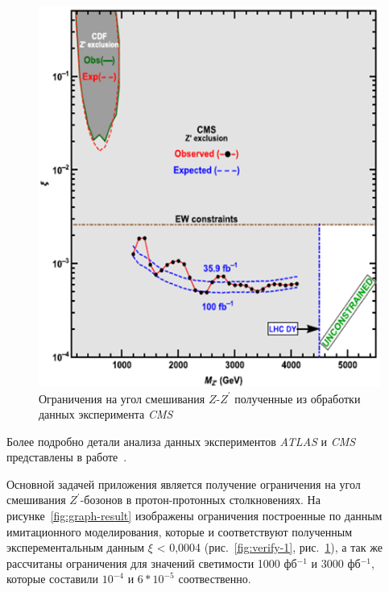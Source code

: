 \begin{figure}[!h]
	\centering
	\includegraphics[width=\textwidth]{figures/verify-2.png}
	\caption{Ограничения на угол смешивания $Z$-${Z}^{\prime}$ полученные из обработки данных эксперимента \textit{CMS}~\cite{2part-pankov}}
	\label{fig:verify-2}
\end{figure}

Более подробно детали анализа данных экспериментов \textit{ATLAS} и \textit{CMS} представлены в работе~\cite{2part-pankov}. 

Основной задачей приложения является получение ограничения на угол смешивания ${Z}^{\prime}$-бозонов в протон-протонных столкновениях. На рисунке~\ref{fig:graph-result} изображены ограничения построенные по данным имитационного моделирования, которые и соответствуют полученным эксперементальным данным $\xi$ < 0,0004 (рис.~\ref{fig:verify-1}, рис.~\ref{fig:verify-2}), а так же рассчитаны ограничения для значений светимости 1000 фб${}^{−1}$ и 3000 фб${}^{−1}$, которые составили ${10}^{-4}$ и $6*{10}^{-5}$ соотвественно.


